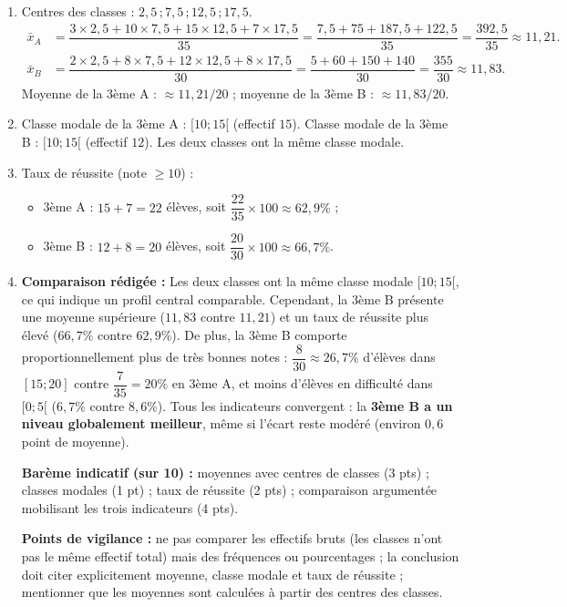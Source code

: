\documentclass[11pt]{article}
\begin{document}
\begin{corrige}
\begin{enumerate}
    \item Centres des classes : $2,5\,; 7,5\,; 12,5\,; 17,5$.
    \begin{align*}
    \bar{x}_A &= \dfrac{3 \times 2,5 + 10 \times 7,5 + 15 \times 12,5 + 7 \times 17,5}{35} = \dfrac{7,5 + 75 + 187,5 + 122,5}{35} = \dfrac{392,5}{35} \approx 11,21. \\
    \bar{x}_B &= \dfrac{2 \times 2,5 + 8 \times 7,5 + 12 \times 12,5 + 8 \times 17,5}{30} = \dfrac{5 + 60 + 150 + 140}{30} = \dfrac{355}{30} \approx 11,83.
    \end{align*}
    Moyenne de la 3ème A : $\approx 11,21/20$ ; moyenne de la 3ème B : $\approx 11,83/20$.
    \item Classe modale de la 3ème A : $[10 ; 15[$ (effectif $15$). Classe modale de la 3ème B : $[10 ; 15[$ (effectif $12$). Les deux classes ont la même classe modale.
    \item Taux de réussite (note $\ge 10$) :
    \begin{itemize}
        \item 3ème A : $15 + 7 = 22$ élèves, soit $\dfrac{22}{35} \times 100 \approx 62,9\%$ ;
        \item 3ème B : $12 + 8 = 20$ élèves, soit $\dfrac{20}{30} \times 100 \approx 66,7\%$.
    \end{itemize}
    \item \textbf{Comparaison rédigée :} Les deux classes ont la même classe modale $[10 ; 15[$, ce qui indique un profil central comparable. Cependant, la 3ème B présente une moyenne supérieure ($11,83$ contre $11,21$) et un taux de réussite plus élevé ($66,7\%$ contre $62,9\%$). De plus, la 3ème B comporte proportionnellement plus de très bonnes notes : $\dfrac{8}{30} \approx 26,7\%$ d'élèves dans $[15 ; 20]$ contre $\dfrac{7}{35} = 20\%$ en 3ème A, et moins d'élèves en difficulté dans $[0 ; 5[$ ($6,7\%$ contre $8,6\%$). Tous les indicateurs convergent : la \textbf{3ème B a un niveau globalement meilleur}, même si l'écart reste modéré (environ $0,6$ point de moyenne).
    
    \textbf{Barème indicatif (sur 10) :} moyennes avec centres de classes (3 pts) ; classes modales (1 pt) ; taux de réussite (2 pts) ; comparaison argumentée mobilisant les trois indicateurs (4 pts).
    
    \textbf{Points de vigilance :} ne pas comparer les effectifs bruts (les classes n'ont pas le même effectif total) mais des fréquences ou pourcentages ; la conclusion doit citer explicitement moyenne, classe modale et taux de réussite ; mentionner que les moyennes sont calculées à partir des centres des classes.
\end{enumerate}
\end{corrige}
\end{document}
